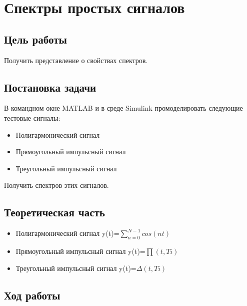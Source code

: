 \chapter{Спектры простых сигналов}

\section{Цель работы}
Получить представление о свойствах спектров.

\section{Постановка задачи}
В командном окне MATLAB и в среде Simulink промоделировать следующие тестовые сигналы:
\begin{itemize}
\item Полигармонический сигнал
\item Прямоугольный импульсный сигнал
\item Треугольный импульсный сигнал
\end{itemize}
Получить спектров этих сигналов.

\section{Теоретическая часть}
\begin{itemize}
\item Полигармонический сигнал y(t)=$\sum\limits_{n=0}^{N-1} cos (nt)$ \newline
\item Прямоугольный импульсный сигнал y(t)=$\prod(t,Ti)$ \newline
\item Треугольный импульсный сигнал y(t)=$\Delta(t,Ti)$
\end{itemize}
\section{Ход работы}

